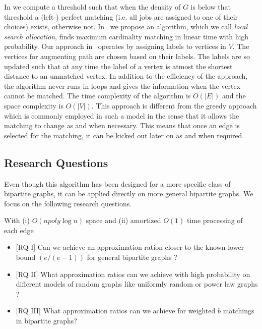 In \cite{kCores} we compute a threshold such that when the density of $G$ is below that threshold a (left-) perfect matching (i.e. all jobs are assigned to one of their choices) exists, otherwise not.
%
In~\cite{ballsbins} we propose an algorithm, which we call \emph{local search allocation}, finds maximum cardinality matching in linear time with high probability.
Our approach in~\cite{ballsbins} operates by assigning labels to vertices in $V$. The vertices for augmenting path are chosen based on their labels. The labels are so updated such that at any time the label of a vertex is atmost the shortest distance to an unmatched vertex. In addition to the efficiency of the approach, the algorithm never runs in loops and gives the information when the vertex cannot be matched. The time complexity of the algorithm is $O(|E|)$ and the space complexity is $O(|V|)$. This approach is different from the greedy approach which is commonly employed in such a model in the sense that it allows the matching to change as and when necessary. This means that once an edge is selected for the matching, it can be kicked out later on as and when required.

\subsection{Research Questions}

Even though this algorithm has been designed for a more specific class of bipartite graphs, it can be applied directly on more general bipartite graphs. We focus on the following research questions.

With (i) $O(n poly \log n)$ space and  (ii) amortized $O(1)$ time processing of each edge
\begin{itemize}
\item  \textsf{[RQ I]} Can we achieve an approximation ration closer to the known lower bound $(e/(e-1))$ for general bipartite graphs ?
\item \textsf{[RQ II]} What approximation ratios can we achieve with high probability on different models of random graphs like uniformly random or power law graphs ?
\item \textsf{[RQ III]} What approximation ratios can we achieve for weighted $b$ matchings in bipartite graphs?

\end{itemize}

